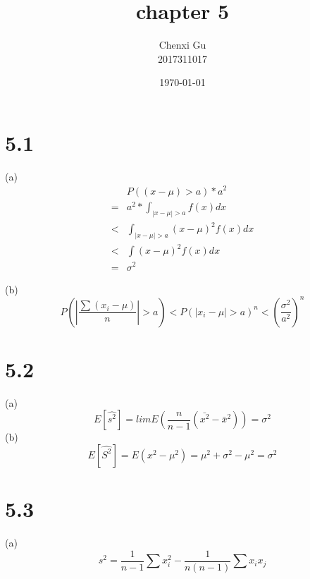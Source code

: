 \documentclass{article}
\begin{document}
\begin{CJK*}{GBK}{song}

\pagestyle{fancy}  
\fancyhead{} %
\renewcommand{\headrulewidth}{0.4pt}  
\renewcommand{\footrulewidth}{0.4pt} 


\title {chapter 5}
\author{Chenxi Gu\\2017311017}

\date{\today}

\maketitle
\section{5.1}
(a)
\begin{equation}
\begin{aligned}
&P((x-\mu)>a)*a^2\\
=&a^2*\int_{|x-\mu|>a}f(x)dx\\
<&\int_{|x-\mu|>a}(x-\mu)^2f(x)dx\\
<&\int(x-\mu)^2f(x)dx\\
=&\sigma^2
\end{aligned}
\end{equation}

(b)
\begin{equation}
P\left(\left|\frac{\sum(x_i-\mu)}{n}\right|>a\right)<P(\left|x_i-\mu\right|>a)^n<\left(\frac{\sigma^2}{a^2}\right)^n
\end{equation}




\section{5.2}
(a)
\begin{equation}
E[\hat{s^2}]=lim E( \frac{n}{n-1}(\bar{x^2}-\bar{x}^2))=\sigma^2
\end{equation}
(b)
\begin{equation}
E[\hat{S^2}]=E(x^2-\mu^2)=\mu^2+\sigma^2-\mu^2=\sigma^2
\end{equation}



\section{5.3}
(a)
\begin{equation}
s^2=\frac{1}{n-1}\sum x_i^2-\frac{1}{n(n-1)}\sum x_ix_j
\end{equation}


\end{CJK*}
\end{document}
